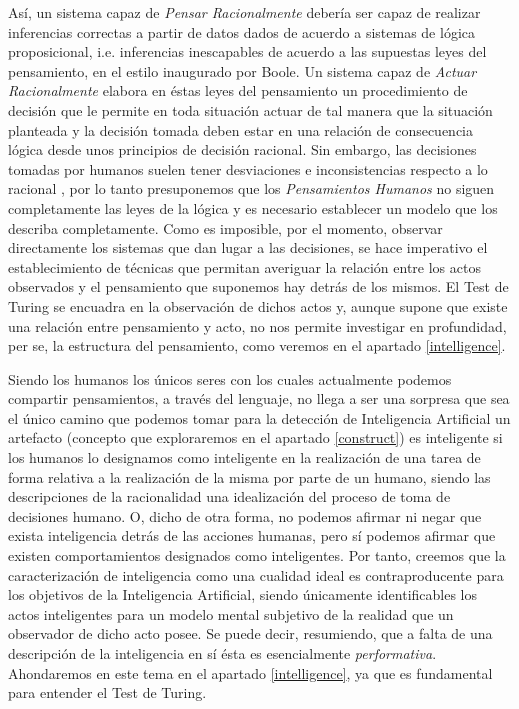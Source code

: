 \documentclass[12pt]{memoir}
\begin{document}
Así, un sistema capaz de \textit{Pensar Racionalmente} debería ser capaz de realizar inferencias correctas a partir de datos dados de acuerdo a sistemas de lógica proposicional, i.e. inferencias inescapables de acuerdo a las supuestas leyes del pensamiento, en el estilo inaugurado por Boole. Un sistema capaz de \textit{Actuar Racionalmente} elabora en éstas leyes del pensamiento un procedimiento de decisión que le permite en toda situación actuar de tal manera que la situación planteada y la decisión tomada deben estar en una relación de consecuencia lógica desde unos principios de decisión racional. Sin embargo, las decisiones tomadas por humanos suelen tener desviaciones e inconsistencias respecto a lo racional \parencite{framingKahnemanTversky}, por lo tanto presuponemos que los \textit{Pensamientos Humanos} no siguen completamente las leyes de la lógica y es necesario establecer un modelo que los describa completamente. Como es imposible, por el momento, observar directamente los sistemas que dan lugar a las decisiones, se hace imperativo el establecimiento de técnicas que permitan averiguar la relación entre los actos observados y el pensamiento que suponemos hay detrás de los mismos. El Test de Turing se encuadra en la observación de dichos actos y, aunque supone que existe una relación entre pensamiento y acto, no nos permite investigar en profundidad, per se, la estructura del pensamiento, como veremos en el apartado \ref{intelligence}.

Siendo los humanos los únicos seres con los cuales actualmente podemos compartir pensamientos, a través del lenguaje, no llega a ser una sorpresa que sea el único camino que podemos tomar para la detección de Inteligencia Artificial un artefacto (concepto que exploraremos en el apartado \ref{construct}) es inteligente si los humanos lo designamos como inteligente en la realización de una tarea de forma relativa a la realización de la misma por parte de un humano, siendo las descripciones de la racionalidad una idealización del proceso de toma de decisiones humano. O, dicho de otra forma, no podemos afirmar ni negar que exista inteligencia detrás de las acciones humanas, pero sí podemos afirmar que existen comportamientos designados como inteligentes. Por tanto, creemos que la caracterización de inteligencia como una cualidad ideal es contraproducente para los objetivos de la Inteligencia Artificial, siendo únicamente identificables los actos inteligentes para un modelo mental subjetivo de la realidad que un observador de dicho acto posee. Se puede decir, resumiendo, que a falta de una descripción de la inteligencia en sí ésta es esencialmente \textit{performativa}. Ahondaremos en este tema en el apartado \ref{intelligence}, ya que es fundamental para entender el Test de Turing.
\end{document}
